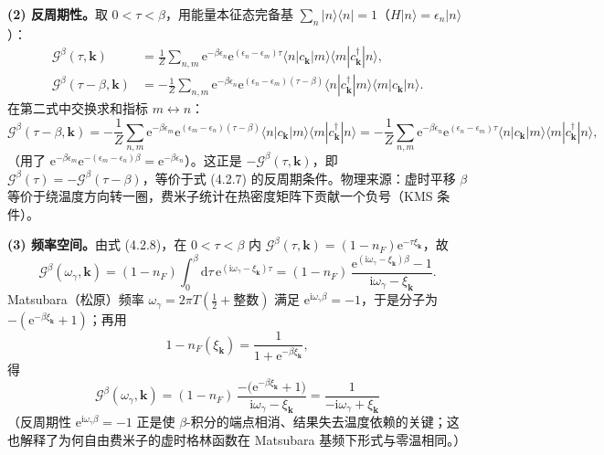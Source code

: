 \textbf{(2) 反周期性。}取 $0<\tau<\beta$，用能量本征态完备基 $\sum_n|n\rangle\langle n|=1$（$H|n\rangle=\epsilon_n|n\rangle$）：
\begin{align*}
\mathcal{G}^\beta(\tau,\pmb{k})&=\frac{1}{Z}\sum_{n,m}\mathrm{e}^{-\beta\epsilon_n}\mathrm{e}^{(\epsilon_n-\epsilon_m)\tau}\langle n|c_{\pmb{k}}|m\rangle\langle m|c^\dagger_{\pmb{k}}|n\rangle,\\
\mathcal{G}^\beta(\tau-\beta,\pmb{k})&=-\frac{1}{Z}\sum_{n,m}\mathrm{e}^{-\beta\epsilon_n}\mathrm{e}^{(\epsilon_n-\epsilon_m)(\tau-\beta)}\langle n|c^\dagger_{\pmb{k}}|m\rangle\langle m|c_{\pmb{k}}|n\rangle .
\end{align*}
在第二式中交换求和指标 $m\leftrightarrow n$：
\begin{equation*}
\mathcal{G}^\beta(\tau-\beta,\pmb{k})
=-\frac{1}{Z}\sum_{n,m}\mathrm{e}^{-\beta\epsilon_m}\mathrm{e}^{(\epsilon_m-\epsilon_n)(\tau-\beta)}\langle n|c_{\pmb{k}}|m\rangle\langle m|c^\dagger_{\pmb{k}}|n\rangle
=-\frac{1}{Z}\sum_{n,m}\mathrm{e}^{-\beta\epsilon_n}\mathrm{e}^{(\epsilon_n-\epsilon_m)\tau}\langle n|c_{\pmb{k}}|m\rangle\langle m|c^\dagger_{\pmb{k}}|n\rangle,
\end{equation*}
（用了 $\mathrm{e}^{-\beta\epsilon_m}\mathrm{e}^{-(\epsilon_m-\epsilon_n)\beta}=\mathrm{e}^{-\beta\epsilon_n}$）。这正是 $-\mathcal{G}^\beta(\tau,\pmb{k})$，即 $\mathcal{G}^\beta(\tau)=-\mathcal{G}^\beta(\tau-\beta)$，等价于式 (4.2.7) 的反周期条件。物理来源：虚时平移 $\beta$ 等价于绕温度方向转一圈，费米子统计在热密度矩阵下贡献一个负号（KMS 条件）。

\textbf{(3) 频率空间。}由式 (4.2.8)，在 $0<\tau<\beta$ 内 $\mathcal{G}^\beta(\tau,\pmb{k})=(1-n_F)\mathrm{e}^{-\tau\xi_{\pmb{k}}}$，故
\begin{equation*}
\mathcal{G}^\beta(\omega_\gamma,\pmb{k})
=(1-n_F)\int_0^\beta\mathrm{d}\tau\,\mathrm{e}^{(\mathrm{i}\omega_\gamma-\xi_{\pmb{k}})\tau}
=(1-n_F)\,\frac{\mathrm{e}^{(\mathrm{i}\omega_\gamma-\xi_{\pmb{k}})\beta}-1}{\mathrm{i}\omega_\gamma-\xi_{\pmb{k}}}.
\end{equation*}
Matsubara（松原）频率 $\omega_\gamma=2\pi T(\frac12+\text{整数})$ 满足 $\mathrm{e}^{\mathrm{i}\omega_\gamma\beta}=-1$，于是分子为 $-(\mathrm{e}^{-\beta\xi_{\pmb{k}}}+1)$；再用
\begin{equation*}
1-n_F(\xi_{\pmb{k}})=\frac{1}{1+\mathrm{e}^{-\beta\xi_{\pmb{k}}}},
\end{equation*}
得
\begin{equation*}
\boxed{\;\mathcal{G}^\beta(\omega_\gamma,\pmb{k})
=(1-n_F)\,\frac{-\big(\mathrm{e}^{-\beta\xi_{\pmb{k}}}+1\big)}{\mathrm{i}\omega_\gamma-\xi_{\pmb{k}}}
=\frac{1}{-\mathrm{i}\omega_\gamma+\xi_{\pmb{k}}}\;}
\end{equation*}
（反周期性 $\mathrm{e}^{\mathrm{i}\omega_\gamma\beta}=-1$ 正是使 $\beta$-积分的端点相消、结果失去温度依赖的关键；这也解释了为何自由费米子的虚时格林函数在 Matsubara 基频下形式与零温相同。）

